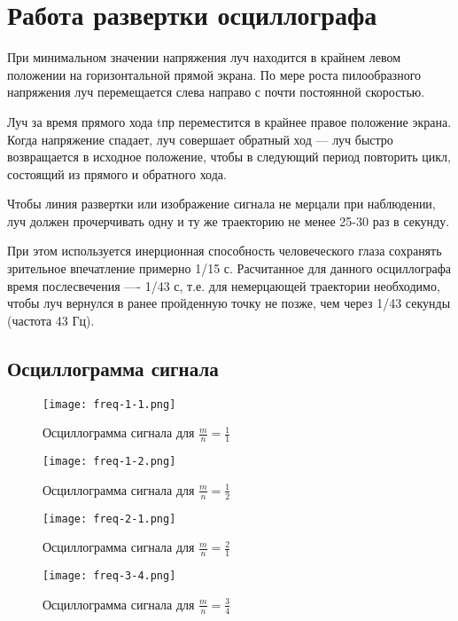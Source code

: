 \newpage
\section{Работа развертки осциллографа}

При минимальном значении напряжения луч находится в крайнем левом положении на горизонтальной прямой экрана. По мере роста пилообразного напряжения луч перемещается слева направо с почти постоянной скоростью.

Луч за время прямого хода tпр переместится в крайнее правое положение экрана.  Когда напряжение спадает, луч совершает обратный ход — луч быстро возвращается в исходное положение, чтобы в следующий период повторить цикл, состоящий из прямого и обратного хода.

Чтобы линия развертки или изображение сигнала не мерцали при наблюдении, луч должен прочерчивать одну и ту же траекторию не менее 25-30 раз в секунду. 

При этом используется инерционная способность человеческого глаза сохранять зрительное впечатление примерно 1/15 с. Расчитанное для данного осциллографа время послесвечения ---- 1/43 с, т.е. для немерцающей траектории необходимо, чтобы луч вернулся в ранее пройденную точку не позже, чем через 1/43 секунды (частота 43 Гц).

\subsection{Осциллограмма сигнала}
\begin{figure}[H]
	\centering
	\texttt{[image: freq-1-1.png]}
	\caption{Осциллограмма сигнала для $\frac{m}{n}=\frac{1}{1}$}
	\label{fig:freq-1-1}
\end{figure}

\begin{figure}[H]
	\centering
	\texttt{[image: freq-1-2.png]}
	\caption{Осциллограмма сигнала для $\frac{m}{n}=\frac{1}{2}$}
	\label{fig:freq-1-2}
\end{figure}

\begin{figure}[H]
	\centering
	\texttt{[image: freq-2-1.png]}
	\caption{Осциллограмма сигнала для $\frac{m}{n}=\frac{2}{1}$}
	\label{fig:freq-2-1}
\end{figure}

\begin{figure}[H]
	\centering
	\texttt{[image: freq-3-4.png]}
	\caption{Осциллограмма сигнала для $\frac{m}{n}=\frac{3}{4}$}
	\label{fig:freq-3-4}
\end{figure}

